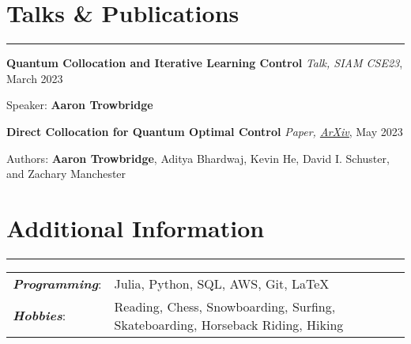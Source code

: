 \documentclass[9pt]{extarticle}
\newcommand{\myline}{\rule[\baselineskip]{\linewidth}{1pt}}
\begin{document}
\section{Talks \& Publications} 
\myline

\textbf{Quantum Collocation and Iterative Learning Control} \hfill \small \textit{Talk, SIAM CSE23}, March 2023 \normalsize
\begin{compactitem}
  \item Speaker: \textbf{Aaron Trowbridge} 
\end{compactitem}

\textbf{Direct Collocation for Quantum Optimal Control} \hfill \small \textit{Paper, \href{https://arxiv.org/abs/2305.03261}{\underline{ArXiv}}}, May 2023 \normalsize
\begin{compactitem}
  \item Authors: \textbf{Aaron Trowbridge}, Aditya Bhardwaj, Kevin He, David I. Schuster, and Zachary Manchester 
\end{compactitem}



\section{Additional Information}
\myline

\normalsize

\begin{tabular}{ll}
\textbf{\textit{Programming}}: & Julia, Python, SQL, AWS, Git, \LaTeX \\
\textbf{\textit{Hobbies}}: & Reading, Chess, Snowboarding, Surfing, Skateboarding, Horseback Riding, Hiking \\    
\end{tabular}
\end{document}
